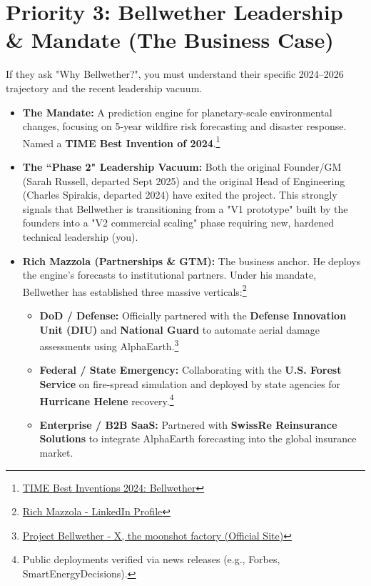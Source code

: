 \documentclass[11pt]{article}
\begin{document}
\section{Priority 3: Bellwether Leadership \& Mandate (The Business Case)}
If they ask "Why Bellwether?", you must understand their specific 2024--2026 trajectory and the recent leadership vacuum.
\begin{itemize}[leftmargin=*]
    \item \textbf{The Mandate:} A prediction engine for planetary-scale environmental changes, focusing on 5-year wildfire risk forecasting and disaster response. Named a \textbf{TIME Best Invention of 2024}.\footnote{\href{https://time.com/7094770/bellwether/}{TIME Best Inventions 2024: Bellwether}}
    \item \textbf{The ``Phase 2" Leadership Vacuum:} Both the original Founder/GM (Sarah Russell, departed Sept 2025) and the original Head of Engineering (Charles Spirakis, departed 2024) have exited the project. This strongly signals that Bellwether is transitioning from a "V1 prototype" built by the founders into a "V2 commercial scaling" phase requiring new, hardened technical leadership (you).
    \item \textbf{Rich Mazzola (Partnerships \& GTM):} The business anchor. He deploys the engine's forecasts to institutional partners. Under his mandate, Bellwether has established three massive verticals:\footnote{\href{https://www.linkedin.com/in/richamazzola/}{Rich Mazzola - LinkedIn Profile}}
    \begin{itemize}
        \item \textbf{DoD / Defense:} Officially partnered with the \textbf{Defense Innovation Unit (DIU)} and \textbf{National Guard} to automate aerial damage assessments using AlphaEarth.\footnote{\href{https://x.company/projects/bellwether/}{Project Bellwether - X, the moonshot factory (Official Site)}}
        \item \textbf{Federal / State Emergency:} Collaborating with the \textbf{U.S. Forest Service} on fire-spread simulation and deployed by state agencies for \textbf{Hurricane Helene} recovery.\footnote{Public deployments verified via news releases (e.g., Forbes, SmartEnergyDecisions).}
        \item \textbf{Enterprise / B2B SaaS:} Partnered with \textbf{SwissRe Reinsurance Solutions} to integrate AlphaEarth forecasting into the global insurance market.
    \end{itemize}
\end{itemize}
\end{document}
